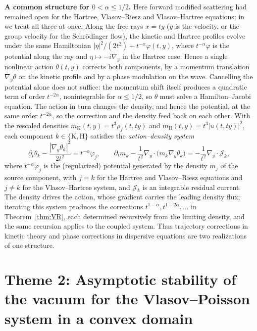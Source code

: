 \documentclass[10pt,reqno]{amsart}
\theoremstyle{definition}
\def\pr{\partial}
\begin{document}
\noindent\textbf{A common structure for $0<\alpha\leq1/2$.} Here forward modified scattering had remained open for the Hartree, Vlasov--Riesz and Vlasov--Hartree equations; in \cite{HX26b} we treat all three at once. Along the free rays $x=ty$ ($y$ is the velocity, or the group velocity for the Schr\"odinger flow), the kinetic and Hartree profiles evolve under the same Hamiltonian $|\eta|^2/(2t^2)+t^{-\alpha}\varphi(t,y)$, where $t^{-\alpha}\varphi$ is the potential along the ray and $\eta\mapsto-i\nabla_y$ in the Hartree case. Hence a single nonlinear action $\theta(t,y)$ corrects both components, by a momentum translation $\nabla_y\theta$ on the kinetic profile and by a phase modulation on the wave. Cancelling the potential alone does not suffice: the momentum shift itself produces a quadratic term of order $t^{-2\alpha}$, nonintegrable for $\alpha\leq1/2$, so $\theta$ must solve a Hamilton--Jacobi equation. The action in turn changes the density, and hence the potential, at the same order $t^{-2\alpha}$, so the correction and the density feed back on each other. With the rescaled densities $m_{\mathrm K}(t,y)=t^3\rho_f(t,ty)$ and $m_{\mathrm H}(t,y)=t^3|u(t,ty)|^2$, each component $k\in\{\mathrm K,\mathrm H\}$ satisfies the \emph{action--density system}
\[
\pr_t\theta_k-\frac{|\nabla_y\theta_k|^2}{2t^2}=t^{-\alpha}\varphi_j,\qquad
\pr_t m_k-\frac{1}{t^2}\nabla_y\cdot\bigl(m_k\nabla_y\theta_k\bigr)=-\frac{1}{t^2}\nabla_y\cdot\mathcal J_k,
\]
where $t^{-\alpha}\varphi_j$ is the (regularized) potential generated by the density $m_j$ of the source component, with $j=k$ for the Hartree and Vlasov--Riesz equations and $j\neq k$ for the Vlasov--Hartree system, and $\mathcal J_k$ is an integrable residual current. The density drives the action, whose gradient carries the leading density flux; iterating this system produces the corrections $t^{1-\alpha},t^{1-2\alpha},\dots$ in Theorem~\ref{thm:VR}, each determined recursively from the limiting density, and the same recursion applies to the coupled system. Thus trajectory corrections in kinetic theory and phase corrections in dispersive equations are two realizations of one structure.








 
 


\section*{Theme 2: Asymptotic stability of the vacuum for the Vlasov--Poisson system in a convex domain}
\end{document}
